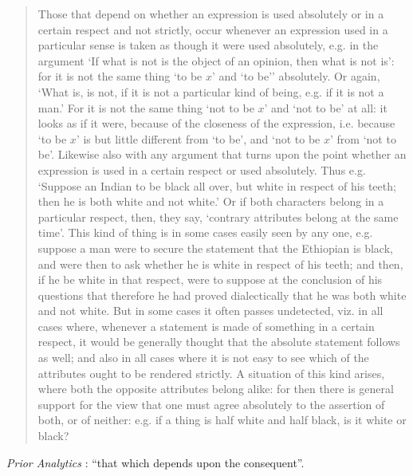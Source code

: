 \documentclass{article}
\begin{document}
\begin{quote}
Those that depend on whether an expression is used absolutely or in a certain respect and not strictly, occur whenever an expression used in a particular sense is taken as though it were used absolutely, e.g. in the argument `If what is not is the object of an opinion, then what is not is': for it is not the same thing `to be $x$' and `to be'' absolutely.
Or again, `What is, is not, if it is not a particular kind of being, e.g. if it is not a man.' For it is not the same thing `not to be $x$' and `not to be' at all: it looks as if it were, because of the closeness of the expression, i.e. because `to be $x$' is but little different from `to be', and `not to be $x$' from `not to be'. Likewise also with any argument that turns upon the point whether an expression is used in a certain respect or used absolutely. Thus e.g. `Suppose an Indian to be black all over, but white in respect of his teeth; then he is both white and not white.' Or if both characters belong in a particular respect, then, they say, `contrary attributes belong at the same time'. This kind of thing is in some cases easily seen by any one, e.g. suppose a man were to secure the statement that the Ethiopian is black, and were then to ask whether he is white in respect of his teeth; and then, if he be white in that respect, were to suppose at the conclusion of his questions that therefore he had proved dialectically that he was both white and not white. But in some cases it often passes undetected, viz. in all cases where, whenever a statement is made of something in a certain respect, it would be generally thought that the absolute statement follows as well; and also in all cases where it is not easy to see which of the attributes ought to be rendered strictly. A situation of this kind arises, where both the opposite attributes belong alike: for then there is general support for the view that one must agree absolutely to the assertion of both, or of neither: e.g. if a thing is half white and half black, is it white or black? 
\end{quote}












{\em Prior Analytics} \cite{strikerI}: ``that which depends upon the consequent''. 
\end{document}
